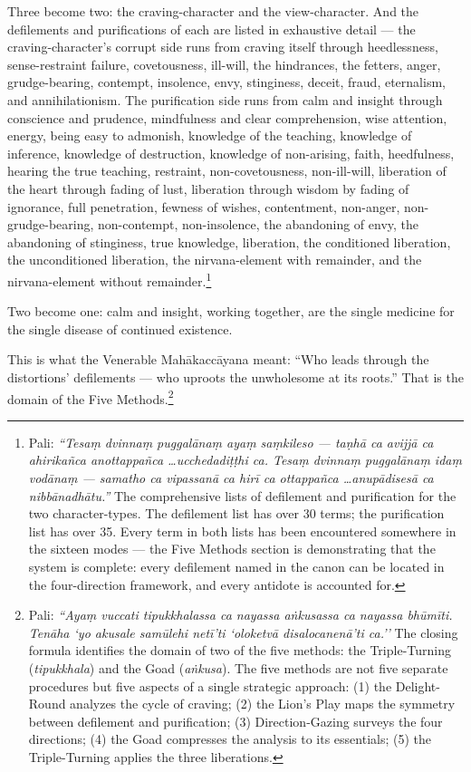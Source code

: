 Three become two: the craving-character and the view-character. And the defilements and purifications of each are listed in exhaustive detail --- the craving-character's corrupt side runs from craving itself through heedlessness, sense-restraint failure, covetousness, ill-will, the hindrances, the fetters, anger, grudge-bearing, contempt, insolence, envy, stinginess, deceit, fraud, eternalism, and annihilationism. The purification side runs from calm and insight through conscience and prudence, mindfulness and clear comprehension, wise attention, energy, being easy to admonish, knowledge of the teaching, knowledge of inference, knowledge of destruction, knowledge of non-arising, faith, heedfulness, hearing the true teaching, restraint, non-covetousness, non-ill-will, liberation of the heart through fading of lust, liberation through wisdom by fading of ignorance, full penetration, fewness of wishes, contentment, non-anger, non-grudge-bearing, non-contempt, non-insolence, the abandoning of envy, the abandoning of stinginess, true knowledge, liberation, the conditioned liberation, the unconditioned liberation, the nirvana-element with remainder, and the nirvana-element without remainder.\footnote{Pali: \textit{``Tesaṃ dvinnaṃ puggalānaṃ ayaṃ saṃkileso --- taṇhā ca avijjā ca ahirikañca anottappañca \ldots ucchedadiṭṭhi ca. Tesaṃ dvinnaṃ puggalānaṃ idaṃ vodānaṃ --- samatho ca vipassanā ca hirī ca ottappañca \ldots anupādisesā ca nibbānadhātu.''} The comprehensive lists of defilement and purification for the two character-types. The defilement list has over 30 terms; the purification list has over 35. Every term in both lists has been encountered somewhere in the sixteen modes --- the Five Methods section is demonstrating that the system is complete: every defilement named in the canon can be located in the four-direction framework, and every antidote is accounted for.}

Two become one: calm and insight, working together, are the single medicine for the single disease of continued existence.

This is what the Venerable Mahākaccāyana meant: ``Who leads through the distortions' defilements --- who uproots the unwholesome at its roots.'' That is the domain of the Five Methods.\footnote{Pali: \textit{``Ayaṃ vuccati tipukkhalassa ca nayassa aṅkusassa ca nayassa bhūmīti. Tenāha `yo akusale samūlehi netī'ti `oloketvā disalocanenā'ti ca.''} The closing formula identifies the domain of two of the five methods: the Triple-Turning (\textit{tipukkhala}) and the Goad (\textit{aṅkusa}). The five methods are not five separate procedures but five aspects of a single strategic approach: (1) the Delight-Round analyzes the cycle of craving; (2) the Lion's Play maps the symmetry between defilement and purification; (3) Direction-Gazing surveys the four directions; (4) the Goad compresses the analysis to its essentials; (5) the Triple-Turning applies the three liberations.}
